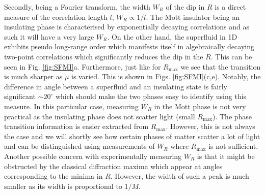 Secondly, being a Fourier transform, the width $W_R$ of the dip in $R$
is a direct measure of the correlation length $l$, $W_R \propto
1/l$. The Mott insulator being an insulating phase is characterised by
exponentially decaying correlations and as such it will have a very
large $W_R$. On the other hand, the superfluid in 1D exhibits pseudo
long-range order which manifests itself in algebraically decaying
two-point correlations \cite{giamarchi} which significantly reduces
the dip in the $R$. This can be seen in
Fig. \ref{fig:SFMI}a. Furthermore, just like for $R_\text{max}$ we see
that the transition is much sharper as $\mu$ is varied. This is shown
in Figs. \ref{fig:SFMI}(c,e). Notably, the difference in angle between
a superfluid and an insulating state is fairly significant
$\sim 20^\circ$ which should make the two phases easy to identify
using this measure. In this particular case, measuring $W_R$ in the
Mott phase is not very practical as the insulating phase does not
scatter light (small $R_\mathrm{max}$). The phase transition
information is easier extracted from $R_\mathrm{max}$. However, this
is not always the case and we will shortly see how certain phases of
matter scatter a lot of light and can be distinguished using
measurements of $W_R$ where $R_\mathrm{max}$ is not
sufficient. Another possible concern with experimentally measuring
$W_R$ is that it might be obstructed by the classical diffraction
maxima which appear at angles corresponding to the minima in
$R$. However, the width of such a peak is much smaller as its width is
proportional to $1/M$.

